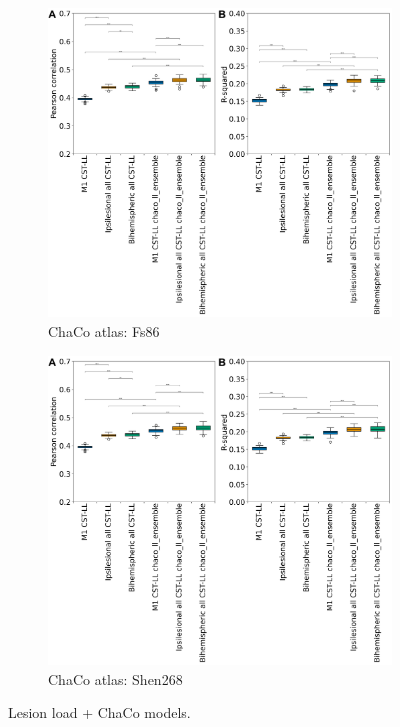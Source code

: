 \documentclass[10pt]{article}
\begin{document}
\begin{figure}
\begin{subfigure}{0.5\textwidth}
  \centering
  \includegraphics[width=1\linewidth]{figures/Analysis4.png}
  \caption{ChaCo atlas: Fs86}
  \label{fig:sfig1}
\end{subfigure}
\begin{subfigure}{0.5\textwidth}
  \centering
  \includegraphics[width=1\linewidth]{figures/Analysis5.png}
  \caption{ChaCo atlas: Shen268}
  \label{fig:sfig2}
\end{subfigure}
\caption{Lesion load + ChaCo models.}
\label{fig:fig}
\end{figure}
\end{document}
